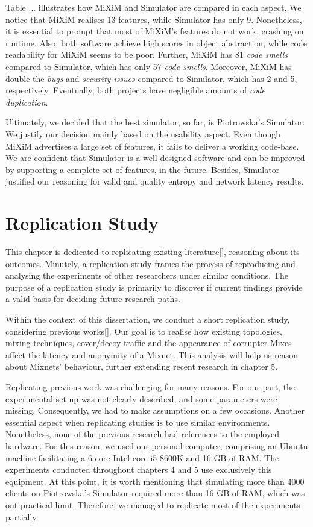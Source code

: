 \documentclass[logo,msc,cyber]{infthesis}   %
\begin{document}
Table ... illustrates how MiXiM and Simulator are compared in each aspect. We
notice that MiXiM realises 13 features, while Simulator has only 9. Nonetheless,
it is essential to prompt that most of MiXiM's features do not work, crashing on
runtime. Also, both software achieve high scores in object abstraction, while
code readability for MiXiM seems to be poor. Further, MiXiM has 81 \emph{code
smells} compared to Simulator, which  has only 57 \emph{code smells}. Moreover,
MiXiM has double the \emph{bugs} and \emph{security issues} compared to
Simulator, which has 2 and 5, respectively. Eventually, both projects have
negligible amounts of \emph{code duplication}.

Ultimately, we decided that the best simulator, so far, is Piotrowska's
Simulator. We justify our decision mainly based on the usability aspect. Even
though MiXiM advertises a large set of features, it fails to deliver a working
code-base. We are confident that Simulator is a well-designed software and can
be improved by supporting a complete set of features, in the future. Besides,
Simulator justified our reasoning for valid and quality entropy and network
latency results. 

\chapter{Replication Study}
This chapter is dedicated to replicating existing literature[], reasoning about
its outcomes. Minutely, a replication study frames the process of reproducing
and analysing the experiments of other researchers under similar conditions. The
purpose of a replication study is primarily to discover if current findings
provide a valid basis for deciding future research paths.

Within the context of this dissertation, we conduct a short replication study,
considering previous works[]. Our goal is to realise how existing topologies,
mixing techniques, cover/decoy traffic and the appearance of corrupter Mixes
affect the latency and anonymity of a Mixnet. This analysis will help us reason
about Mixnets' behaviour, further extending recent research in chapter 5.

Replicating previous work was challenging for many reasons. For our part, the
experimental set-up was not clearly described, and some parameters were missing.
Consequently, we had to make assumptions on a few occasions. Another essential
aspect when replicating studies is to use similar environments. Nonetheless,
none of the previous research had references to the employed hardware. For this
reason, we used our personal computer, comprising an Ubuntu machine facilitating
a 6-core Intel core i5-8600K and 16 GB of RAM. The experiments conducted
throughout chapters 4 and 5 use exclusively this equipment. At this point, it is
worth mentioning that simulating more than 4000 clients on Piotrowska's
Simulator required more than 16 GB of RAM, which was out practical limit.
Therefore, we managed to replicate most of the experiments partially. 
\end{document}
